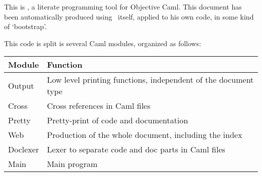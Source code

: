 
\newcommand{\ocaml}{\textsf{Objective Caml}}

\ocwsection
This is \ocamlweb, a literate programming tool for \ocaml.
This document has been automatically produced using \ocamlweb\ itself,
applied to his own code, in some kind of `bootstrap'.

This code is split is several Caml modules, organized as follows:

\begin{center}
\begin{tabular}{|l|l|}
  \hline
  \bf Module  &  \bf Function \\
  \hline\hline
  Output  &  Low level printing functions, independent of the document
  type \\
  \hline
  Cross   & Cross references in Caml files \\
  \hline
  Pretty  & Pretty-print of code and documentation \\
  \hline
  Web     & Production of the whole document, including the index \\
  \hline
  Doclexer& Lexer to separate code and doc parts in Caml files \\
  \hline
  Main    & Main program \\
  \hline
\end{tabular}
\end{center}
